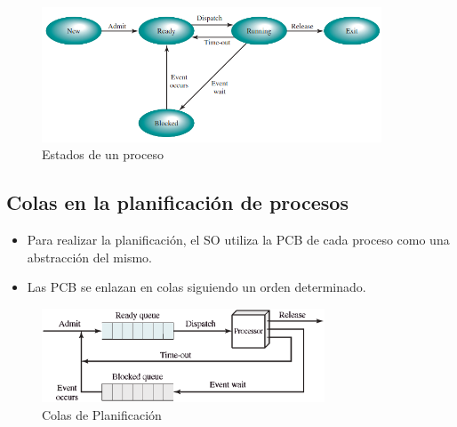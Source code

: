 \begin{figure}[h]
    \begin{center}
        \includegraphics[width=0.90\textwidth]{assets/estados.png}
    \end{center}
    \caption{Estados de un proceso}\label{fig:}
\end{figure}


\subsection{Colas en la planificación de procesos}
\begin{itemize}
    \item Para realizar la planificación, el SO utiliza la PCB de cada proceso como una abstracción del mismo.
    \item Las PCB se enlazan en colas siguiendo un orden determinado.
\end{itemize}
\begin{figure}[h]
    \begin{center}
        \includegraphics[width=0.75\textwidth]{assets/ProcessQueue.eps}
    \end{center}
    \caption{Colas de Planificación}\label{fig:}
\end{figure}
\pagebreak

